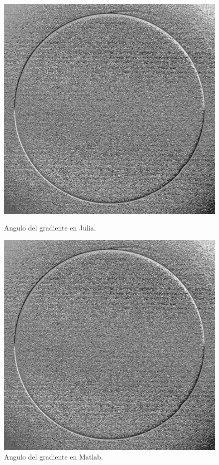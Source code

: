 \documentclass[11pt, letterpaper]{article}
\begin{document}
\begin{figure}[h]	
	\begin{minipage}{0.48\textwidth} %
		\centering
		\includegraphics[width=\textwidth]{IMG/q41.png} %
		\caption{Angulo del gradiente en Julia.}
		\label{fig:img8}
	\end{minipage}\hfill %
	\begin{minipage}{0.48\textwidth} %
		\centering
		\includegraphics[width=\textwidth]{IMG/q4.png} %
		\caption{Angulo del gradiente en Matlab.}
		\label{fig:img9}
	\end{minipage}
	

\end{figure}
\end{document}
